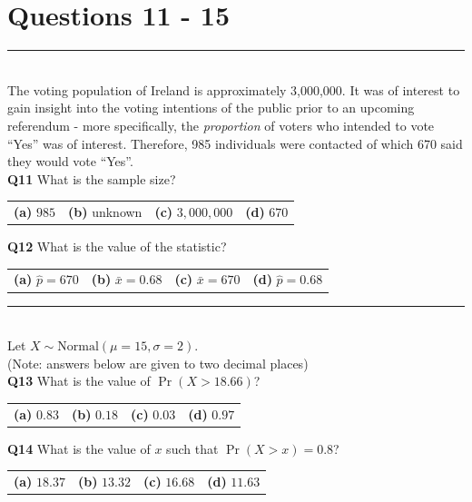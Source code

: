 \documentclass[12pt]{article}
\begin{document}
\newpage

\section*{Questions 11 - 15}


\rule{\linewidth}{1pt}
\quad\\
The voting population of Ireland is approximately 3,000,000. It was of interest to gain insight into the voting intentions of the public prior to an upcoming referendum - more specifically, the \emph{proportion} of voters who intended to vote ``Yes'' was of interest. Therefore, 985 individuals were contacted of which 670 said they would vote ``Yes''.
\\[0.2cm]

{\bf Q11} What is the sample size?\\[0.2cm]
\begin{tabular}{cccc}
{\bf(a)} $985$ & {\bf(b)} unknown & {\bf(c)} $3,000,000$ & {\bf(d)} $670$ \\[0.6cm]
\end{tabular}

{\bf Q12} What is the value of the statistic? \\[0.2cm]
\begin{tabular}{cccc}
{\bf(a)} $\hat p = 670$ & {\bf(b)} $\bar x = 0.68$ & {\bf(c)} $\bar x = 670$  & {\bf(d)} $\hat p = 0.68$ \\[0.6cm]
\end{tabular}


\rule{\linewidth}{1pt}
\quad\\
Let $X \sim \text{Normal}(\mu=15,\sigma=2)$.\\{\footnotesize(Note: answers below are given to two decimal places)}\\[0.2cm]

{\bf Q13} What is the value of $\Pr(X > 18.66)$?\\[0.2cm]
\begin{tabular}{cccc}
{\bf(a)} $0.83$ & {\bf(b)} $0.18$ & {\bf(c)} $0.03$  & {\bf(d)} $0.97$ \\[0.6cm]
\end{tabular}


{\bf Q14} What is the value of $x$ such that $\Pr(X > x) = 0.8$?\\[0.2cm]
\begin{tabular}{cccc}
{\bf(a)} $18.37$  & {\bf(b)} $13.32$ & {\bf(c)} $16.68$ & {\bf(d)} $11.63$   \\[0.6cm]
\end{tabular}
\end{document}
